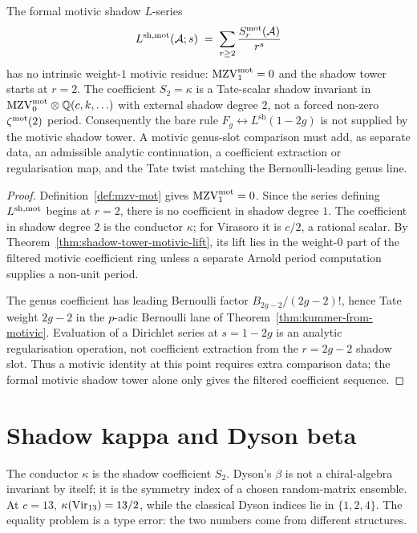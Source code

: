 \begin{corollary}
\ClaimStatusConditional
The formal motivic shadow $L$-series
\[
 L^{\mathrm{sh}, \mathrm{mot}}(\mathcal{A}; s)
 \;=\; \sum_{r \geq 2} \frac{S_r^{\mathrm{mot}}(\mathcal{A})}{r^s}
\]
has no intrinsic weight-$1$ motivic residue: $\mathrm{MZV}^{\mathrm{mot}}_1=0$ and the
shadow tower starts at $r=2$. The coefficient $S_2=\kappa$ is a
Tate-scalar shadow invariant in
$\mathrm{MZV}^{\mathrm{mot}}_0\otimes\mathbb Q(c,k,\ldots)$ with external shadow
degree $2$, not a forced non-zero $\zeta^{\mathrm{mot}}(2)$ period.
Consequently the bare rule
$F_g \leftrightarrow L^{\mathrm{sh}}(1-2g)$ is not supplied by the
motivic shadow tower. A motivic genus-slot comparison must add, as
separate data, an admissible analytic continuation, a coefficient
extraction or regularisation map, and the Tate twist matching the
Bernoulli-leading genus line.
\end{corollary}

\begin{proof}
Definition~\ref{def:mzv-mot} gives $\mathrm{MZV}^{\mathrm{mot}}_1=0$. Since the
series defining $L^{\mathrm{sh},\mathrm{mot}}$ begins at $r=2$, there is no
coefficient in shadow degree $1$. The coefficient in shadow degree $2$
is the conductor $\kappa$; for Virasoro it is $c/2$, a rational scalar.
By Theorem~\ref{thm:shadow-tower-motivic-lift}, its lift lies in the
weight-$0$ part of the filtered motivic coefficient ring unless a
separate Arnold period computation supplies a non-unit period.

The genus coefficient has leading Bernoulli factor
$B_{2g-2}/(2g-2)!$, hence Tate weight $2g-2$ in the $p$-adic Bernoulli
lane of Theorem~\ref{thm:kummer-from-motivic}. Evaluation of a
Dirichlet series at $s=1-2g$ is an analytic regularisation operation,
not coefficient extraction from the $r=2g-2$ shadow slot. Thus a
motivic identity at this point requires extra comparison data; the
formal motivic shadow tower alone only gives the filtered coefficient
sequence.
\end{proof}

\section{Shadow kappa and Dyson beta}
\label{sec:kappa-vs-beta}

The conductor $\kappa$ is the shadow coefficient $S_2$. Dyson's
$\beta$ is not a chiral-algebra invariant by itself; it is the
symmetry index of a chosen random-matrix ensemble. At $c=13$,
$\kappa(\mathrm{Vir}_{13})=13/2$, while the classical Dyson indices lie in
$\{1,2,4\}$. The equality problem is a type error: the two numbers
come from different structures.

